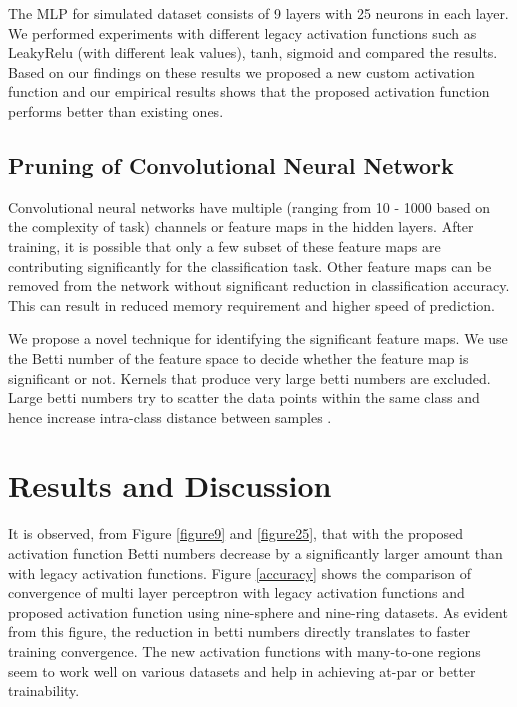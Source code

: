 \documentclass{bmvc2k}
\begin{document}
The MLP for simulated dataset consists of 9 layers with 25 neurons in each layer.
We performed experiments with different legacy activation functions such as LeakyRelu (with different leak values), tanh, sigmoid and compared the results. Based on our findings on these results we proposed a new custom activation function and our empirical results shows that the proposed activation function performs better than existing ones.

\subsection{Pruning of Convolutional Neural Network}\label{network_pruning_1}
Convolutional neural networks have multiple (ranging from 10 - 1000 based on the complexity of task) channels or feature maps in the hidden layers. After training, it is possible that only a few subset of these feature maps are contributing significantly for the classification task. Other feature maps can be removed from the network without significant reduction in classification accuracy. This can result in reduced memory requirement and higher speed of prediction.

We propose a novel technique for identifying the significant  feature maps. We use the Betti number of the feature space to decide whether the feature map is significant or not.  Kernels that produce very large betti numbers are excluded.  Large betti numbers try to scatter the data points within the same class and hence increase intra-class distance between samples .

\section{Results and Discussion}
It is observed, from Figure \ref{figure9} and \ref{figure25},   that with the proposed activation function Betti numbers decrease  by a significantly larger amount than with legacy activation functions.
Figure \ref{accuracy} shows the comparison of convergence  of multi layer perceptron with legacy activation functions and proposed activation function using nine-sphere and nine-ring datasets.
As evident from this figure, the reduction in betti numbers  directly translates to faster training convergence.
The new activation functions with many-to-one regions seem to work well on various datasets and help in achieving at-par or better trainability.
\end{document}

